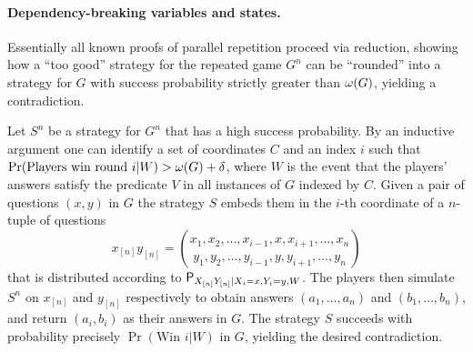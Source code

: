 \paragraph{Dependency-breaking variables and states.} 

%
%


Essentially all known proofs of parallel repetition proceed via reduction, showing how a ``too good'' strategy  for the repeated game $G^n$ can be ``rounded'' into a strategy for $G$ with success probability strictly greater than $\val(G)$, yielding a contradiction. 

Let $S^n$ be a strategy for $G^n$ that has a high success probability. By an inductive argument one can identify a set of coordinates $C$ and an index $i$ such that $\Pr(\text{Players win round $i$} | W) > \val(G) + \delta$, where $W$ is the event that the players' answers satisfy the predicate $V$ in all instances of $G$ indexed by $C$. Given a pair of questions $(x,y)$ in $G$ the strategy $S$ embeds them in the $i$-th coordinate of a $n$-tuple of questions 
$$x_{[n]} y_{[n]} = \binom{x_1, x_2, \ldots, x_{i-1}, x, x_{i+1}, \ldots, x_n}{y_1, y_2, \ldots, y_{i-1}, y, y_{i+1}, \ldots, y_n}$$ 
that is distributed according to $\P_{X_{[n]} Y_{[n]} | X_i = x, Y_i = y,W}$. The players then simulate $S^n$ on  $x_{[n]}$ and $y_{[n]}$ respectively to obtain answers $(a_1,\ldots,a_n)$ and $(b_1,\ldots,b_n)$, and return $(a_i,b_i)$ as their answers in $G$. The strategy $S$ succeeds with probability precisely $\Pr(\text{Win $i$} | W)$ in $G$, yielding the desired contradiction.

